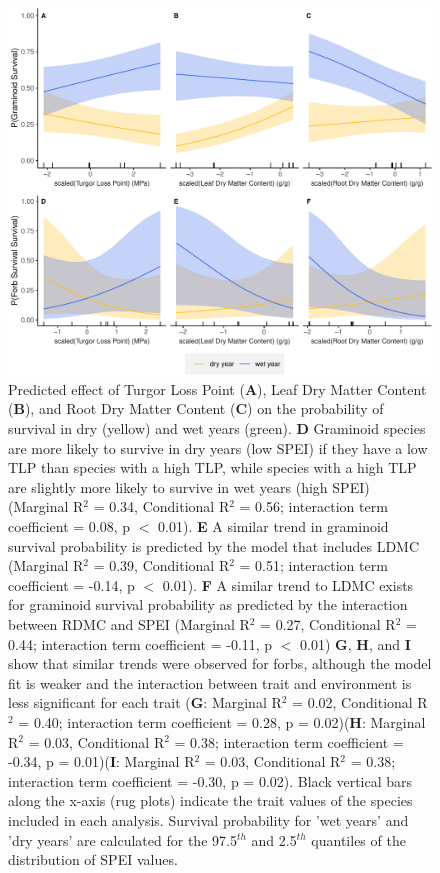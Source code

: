 \documentclass[12pt, letterpaper]{article}
\begin{document}
\begin{figure}
\includegraphics[width=.9\textwidth]{figures/mainObservationsFig-1.pdf}
\caption[width=0.35\textwidth]{\small{Predicted effect of Turgor Loss Point (\textbf{A}), Leaf Dry Matter Content (\textbf{B}), and Root Dry Matter Content (\textbf{C}) on the probability of survival in dry (yellow) and wet years (green). \textbf{D} Graminoid species are more likely to survive in dry years (low SPEI) if they have a low TLP than species with a high TLP, while species with a high TLP are slightly more likely to survive in wet years (high SPEI) (Marginal R$^2$ = 0.34, Conditional R$^2$ = 0.56; interaction term coefficient = 0.08, p $<$ 0.01). \textbf{E} A similar trend in graminoid survival probability is predicted by the model that includes LDMC (Marginal R$^2$ = 0.39, Conditional R$^2$ = 0.51; interaction term coefficient = -0.14, p $<$ 0.01). \textbf{F} A similar trend to LDMC exists for graminoid survival probability as predicted by the interaction between RDMC and SPEI (Marginal R$^2$ = 0.27, Conditional R$^2$ = 0.44; interaction term coefficient = -0.11, p $<$ 0.01)
\textbf{G}, \textbf{H}, and \textbf{I} show that similar trends were observed for forbs, although the model fit is weaker and the interaction between trait and environment is less significant for each trait (\textbf{G}: Marginal R$^2$ = 0.02, Conditional R$^2$ = 0.40; interaction term coefficient = 0.28, p = 0.02)(\textbf{H}: Marginal R$^2$ = 0.03, Conditional R$^2$ = 0.38; interaction term coefficient = -0.34, p = 0.01)(\textbf{I}: Marginal R$^2$ = 0.03, Conditional R$^2$ = 0.38; interaction term coefficient = -0.30, p = 0.02). Black vertical bars along the x-axis (rug plots) indicate the trait values of the species included in each analysis. Survival probability for 'wet years' and 'dry years' are calculated for the 97.5$^{th}$ and 2.5$^{th}$ quantiles of the distribution of SPEI values.
}}
\label{fig:PredsObs}
\end{figure}
\end{document}
